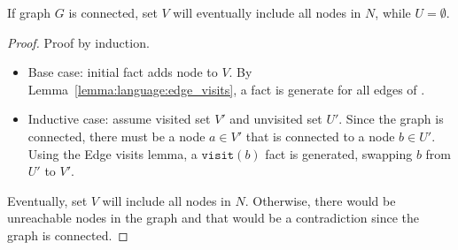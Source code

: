 \begin{theorem}
If graph $G$ is connected, set $V$ will eventually include all nodes in $N$,
while $U = \emptyset$.
\end{theorem}
\begin{proof}
Proof by induction.

\begin{itemize}

   \item Base case: initial fact  adds node  to $V$.
      By Lemma~\ref{lemma:language:edge_visits}, a  fact is generate
      for all edges of .

   \item Inductive case: assume visited set $V'$ and unvisited set $U'$.
  Since the graph
   is connected, there must be a node $a \in V'$ that is connected to a node $b
   \in U'$. Using the Edge visits lemma, a $\mathtt{visit}(b)$ fact is generated,
   swapping $b$ from $U'$ to $V'$.
\end{itemize}

Eventually, set $V$ will include all nodes in $N$. Otherwise, there would be
unreachable nodes in the graph and that would be a contradiction since the graph
is connected.
\end{proof}

